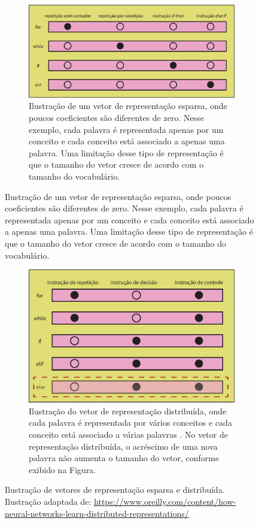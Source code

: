 \begin{figure}[H]
\centering
\begin{subfigure}{.7\textwidth}
  \centering
  \includegraphics[width=1\linewidth]{figuras/cap-trabalhos-relacionados/discrete-representation.pdf}
  \caption{Ilustração de um vetor de representação esparsa, onde poucos coeficientes são diferentes de zero. Nesse exemplo, cada palavra é representada apenas por um conceito e cada conceito está associado a apenas uma palavra. Uma limitação desse tipo de representação é que o tamanho do vetor cresce de acordo com o tamanho do vocabulário.}
  \label{fig:discrete-representation}
\end{subfigure}%
\end{figure}
\begin{figure}[H]
\ContinuedFloat
\centering
\begin{subfigure}{.7\textwidth}
  \centering
  \includegraphics[width=1\linewidth]{figuras/cap-trabalhos-relacionados/distributed-representation.pdf}
  \caption{Ilustração do vetor de representação distribuída, onde cada palavra é representada por vários conceitos e cada conceito está associado a várias palavras \citep{Hinton-distributed-representatons:1986}. No vetor de representação distribuída, o acréscimo de uma nova palavra não aumenta o tamanho do vetor, conforme exibido na Figura.}
  \label{fig:distributed-representation}
\end{subfigure}

\caption[Ilustração de vetores de representação esparsa e distribuída]{Ilustração de vetores de representação esparsa e distribuída. Ilustração adaptada de: \url{https://www.oreilly.com/content/how-neural-networks-learn-distributed-representations/}}
\label{fig:discrete-vs-distributed-representation}
\end{figure}

